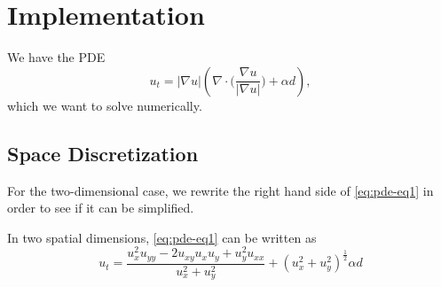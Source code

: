 \chapter{Implementation}

We have the PDE
\begin{equation}
    u_t = |\nabla u| (\nabla \cdot \bigg(\frac{\nabla u}{|\nabla u|}\bigg) + \alpha d),
    \label{eq:pde-eq1}
\end{equation}
which we want to solve numerically.

\section{Space Discretization}
For the two-dimensional case, we rewrite the right hand side of \eqref{eq:pde-eq1} in order to see if it can be simplified. 

\begin{proposition}\label{prop:simplification-equation}
In two spatial dimensions, \eqref{eq:pde-eq1} can be written as
\begin{equation}
    u_t = \frac{u_x^2 u_{yy} - 2 u_{xy} u_x u_y + u_y^2u_{xx}}{u_x^2 + u_y^2} + (u_x^2 + u_y^2)^{\frac{1}{2}}\alpha d
    \label{eq:pde-written-out}
\end{equation}
\end{proposition}

